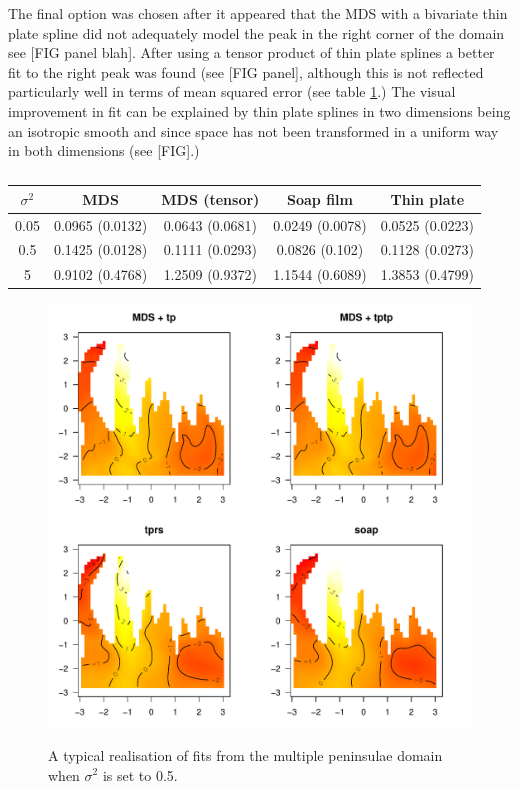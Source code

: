 \documentclass[a4paper,10pt]{article}
\begin{document}
The final option was chosen after it appeared that the MDS with a bivariate thin plate spline did not adequately model the peak in the right corner of the domain see [FIG panel blah]. After using a tensor product of thin plate splines a better fit to the right peak was found (see [FIG panel], although this is not reflected particularly well in terms of mean squared error (see table \ref{wt2resultstable}.) The visual improvement in fit can be explained by thin plate splines in two dimensions being an isotropic smooth and since space has not been transformed in a uniform way in both dimensions (see [FIG].)

\begin{table}[ht]
\centering
\begin{tabular}{c || c c c c}
$\sigma^2$ & MDS & MDS (tensor) & Soap film & Thin plate\\ 
\hline
0.05 & 0.0965 (0.0132) & 0.0643 (0.0681) & 0.0249 (0.0078) & 0.0525 (0.0223)\\ 
0.5 & 0.1425 (0.0128) & 0.1111 (0.0293) & 0.0826 (0.102) & 0.1128 (0.0273)\\ 
5 & 0.9102 (0.4768) & 1.2509 (0.9372) & 1.1544 (0.6089) & 1.3853 (0.4799)\\ 
\end{tabular}
\label{wt2resultstable}
\caption{}
\end{table}

\begin{figure}
\centering
\includegraphics[width=6in]{figs/wt2-fit-05.pdf} \\
\caption{A typical realisation of fits from the multiple peninsulae domain when $\sigma^2$ is set to 0.5.}
\label{wt2-fit-0.5}
\end{figure}
\end{document}
